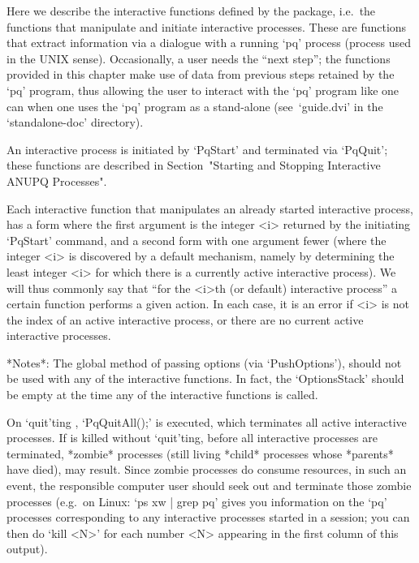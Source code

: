 

Here we describe  the  interactive  functions  defined  by  the  {\ANUPQ}
package, i.e.~the functions  that  manipulate  and  initiate  interactive
{\ANUPQ} processes. These are functions that extract  information  via  a
dialogue with a running `pq' process (process used in  the  UNIX  sense).
Occasionally, a user needs the ``next step''; the functions  provided  in
this chapter make use of data from previous steps retained  by  the  `pq'
program, thus allowing the user to interact with the  `pq'  program  like
one can when one uses the `pq' program as a stand-alone  (see~`guide.dvi'
in the `standalone-doc' directory).

An interactive {\ANUPQ} process is initiated by `PqStart' and  terminated
via `PqQuit'; these functions  are  described  in  Section~"Starting  and
Stopping Interactive ANUPQ Processes".

Each interactive {\ANUPQ} function that manipulates  an  already  started
interactive {\ANUPQ} process, has a form where the first argument is  the
integer <i> returned by the initiating `PqStart' command,  and  a  second
form with one argument fewer (where the integer <i> is  discovered  by  a
default mechanism, namely by determining the least integer <i> for  which
there is a currently active interactive {\ANUPQ} process). We  will  thus
commonly say that ``for  the  <i>th  (or  default)  interactive  {\ANUPQ}
process'' a certain function performs a given action. In each case, it is
an error if <i> is not the index of an  active  interactive  process,  or
there are no current active interactive processes.

*Notes*: 
The global method of passing options (via `PushOptions'), should  not  be
used with any of the interactive functions. In fact,  the  `OptionsStack'
should be empty at the time any of the interactive functions is called.

On `quit'ting  {\GAP}, `PqQuitAll();'  is executed, which  terminates all
active  interactive  {\ANUPQ} processes.   If  {\GAP}  is killed  without
`quit'ting,  before all  interactive {\ANUPQ}  processes  are terminated,
*zombie* processes  (still living *child* processes  whose *parents* have
died), may result. Since zombie processes do consume resources,  in  such
an event, the responsible computer user should  seek  out  and  terminate
those zombie processes (e.g.~on  Linux:  `ps xw  |  grep  pq'  gives  you
information on  the  `pq'  processes  corresponding  to  any  interactive
{\ANUPQ} processes started in a {\GAP} session; you  can  then  do  `kill
<N>' for each number <N> appearing in the first column of this output).

